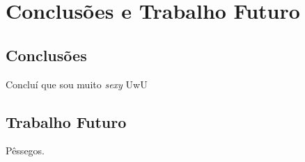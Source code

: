 \chapter{Conclusões e Trabalho Futuro}
\label{ch::conc}

\section{Conclusões}
\label{sec::conc:conc}

Concluí que sou muito \textit{sexy} UwU


\section{Trabalho Futuro}
\label{sec::conc:futuro}

Pêssegos.
